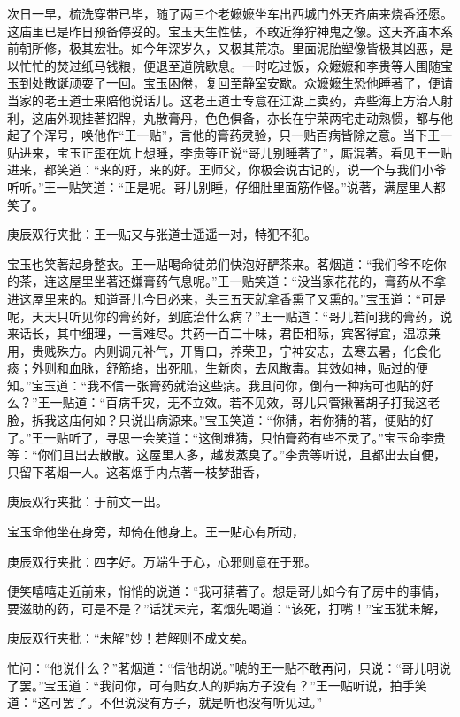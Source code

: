 \begin{parag}


    次日一早，梳洗穿带已毕，随了两三个老嬷嬷坐车出西城门外天齐庙来烧香还愿。这庙里已是昨日预备停妥的。宝玉天生性怯，不敢近狰狞神鬼之像。这天齐庙本系前朝所修，极其宏壮。如今年深岁久，又极其荒凉。里面泥胎塑像皆极其凶恶，是以忙忙的焚过纸马钱粮，便退至道院歇息。一时吃过饭，众嬷嬷和李贵等人围随宝玉到处散诞顽耍了一回。宝玉困倦，复回至静室安歇。众嬷嬷生恐他睡著了，便请当家的老王道士来陪他说话儿。这老王道士专意在江湖上卖药，弄些海上方治人射利，这庙外现挂著招牌，丸散膏丹，色色俱备，亦长在宁荣两宅走动熟惯，都与他起了个浑号，唤他作“王一贴”，言他的膏药灵验，只一贴百病皆除之意。当下王一贴进来，宝玉正歪在炕上想睡，李贵等正说“哥儿别睡著了”，厮混著。看见王一贴进来，都笑道：“来的好，来的好。王师父，你极会说古记的，说一个与我们小爷听听。”王一贴笑道：“正是呢。哥儿别睡，仔细肚里面筋作怪。”说著，满屋里人都笑了。\begin{note}庚辰双行夹批：王一贴又与张道士遥遥一对，特犯不犯。\end{note}宝玉也笑著起身整衣。王一贴喝命徒弟们快泡好酽茶来。茗烟道：“我们爷不吃你的茶，连这屋里坐著还嫌膏药气息呢。”王一贴笑道：“没当家花花的，膏药从不拿进这屋里来的。知道哥儿今日必来，头三五天就拿香熏了又熏的。”宝玉道：“可是呢，天天只听见你的膏药好，到底治什么病？”王一贴道：“哥儿若问我的膏药，说来话长，其中细理，一言难尽。共药一百二十味，君臣相际，宾客得宜，温凉兼用，贵贱殊方。内则调元补气，开胃口，养荣卫，宁神安志，去寒去暑，化食化痰；外则和血脉，舒筋络，出死肌，生新肉，去风散毒。其效如神，贴过的便知。”宝玉道：“我不信一张膏药就治这些病。我且问你，倒有一种病可也贴的好么？”王一贴道：“百病千灾，无不立效。若不见效，哥儿只管揪著胡子打我这老脸，拆我这庙何如？只说出病源来。”宝玉笑道：“你猜，若你猜的著，便贴的好了。”王一贴听了，寻思一会笑道：“这倒难猜，只怕膏药有些不灵了。”宝玉命李贵等：“你们且出去散散。这屋里人多，越发蒸臭了。”李贵等听说，且都出去自便，只留下茗烟一人。这茗烟手内点著一枝梦甜香，\begin{note}庚辰双行夹批：于前文一出。\end{note}宝玉命他坐在身旁，却倚在他身上。王一贴心有所动，\begin{note}庚辰双行夹批：四字好。万端生于心，心邪则意在于邪。\end{note}便笑嘻嘻走近前来，悄悄的说道：“我可猜著了。想是哥儿如今有了房中的事情，要滋助的药，可是不是？”话犹未完，茗烟先喝道：“该死，打嘴！”宝玉犹未解，\begin{note}庚辰双行夹批：“未解”妙！若解则不成文矣。\end{note}忙问：“他说什么？”茗烟道：“信他胡说。”唬的王一贴不敢再问，只说：“哥儿明说了罢。”宝玉道：“我问你，可有贴女人的妒病方子没有？”王一贴听说，拍手笑道：“这可罢了。不但说没有方子，就是听也没有听见过。”
\end{parag}
